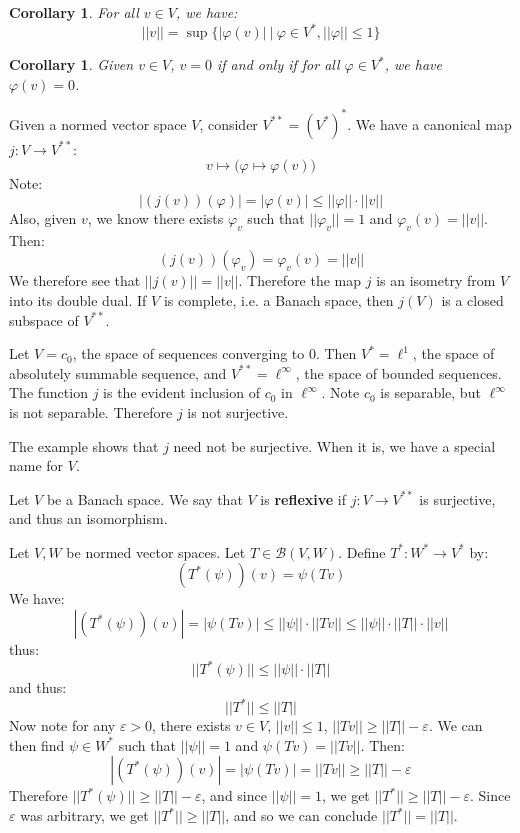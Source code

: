\documentclass[a4paper,12pt]{report}
\newcommand{\ms}[1]{\mathscr{#1}}
\newcommand{\varep}{ \varepsilon }
\newcommand{\vphi} {\varphi}
\newtheorem{corollary}[theorem]{Corollary}
\newenvironment{definition}[1][Definition.]{\begin{trivlist}
\item[\hskip \labelsep {\bfseries #1}]}{\end{trivlist}}
\newenvironment{example}[1][Example.]{\begin{trivlist}
\item[\hskip \labelsep {\bfseries #1}]}{\end{trivlist}}
\begin{document}
	\begin{corollary}
	For all $v \in V$, we have:
	\[ ||v|| = \sup \bigg\{ |\vphi(v)| ~\big|~ \vphi \in V^*, ||\vphi|| \leq 1 \bigg\} \]
	\end{corollary}
	
	\begin{corollary}
	Given $v \in V$, $v = 0$ if and only if for all $\vphi \in V^*$, we have $\vphi(v) = 0$. 
	\end{corollary}
	
	\noindent Given a normed vector space $V$, consider $V^{**} = (V^*)^*$. We have a canonical map $j : V \rightarrow V^{**}$:
	\[ v \mapsto \bigg( \vphi \mapsto \vphi(v) \bigg) \]
	Note:
	\[ |(j(v))(\vphi)| = |\vphi(v)| \leq ||\vphi|| \cdot ||v|| \]
	Also, given $v$, we know there exists $\vphi_v$ such that $||\vphi_v|| = 1$ and $\vphi_v(v) = ||v||$. Then:
	\[ (j(v))(\vphi_v) = \vphi_v(v) = ||v|| \]
	We therefore see that $||j(v)|| = ||v||$. Therefore the map $j$ is an isometry from $V$ into its double dual. If $V$ is complete, i.e. a Banach space, then $j(V)$ is a closed subspace of $V^{**}$. 
	
	\begin{example}
	Let $V = c_0$, the space of sequences converging to 0. Then $V^* = \ell^1$, the space of absolutely summable sequence, and $V^{**} = \ell^\infty$, the space of bounded sequences. The function $j$ is the evident inclusion of $c_0$ in $\ell^\infty$. Note $c_0$ is separable, but $\ell^\infty$ is not separable. Therefore $j$ is not surjective. 
	\end{example}
	
	\noindent The example shows that $j$ need not be surjective. When it is, we have a special name for $V$.
	
	\begin{definition}
	Let $V$ be a Banach space. We say that $V$ is \textbf{reflexive} if $j : V \rightarrow V^{**}$ is surjective, and thus an isomorphism. 
	\end{definition}
	
	\noindent Let $V, W$ be normed vector spaces. Let $T \in \ms{B}(V, W)$. Define $T^* : W^* \rightarrow V^*$ by:
	\[ (T^*(\psi))(v) = \psi(Tv) \]
	We have:
	\[ |(T^*(\psi))(v)| = |\psi(Tv)| \leq ||\psi|| \cdot ||Tv|| \leq ||\psi|| \cdot ||T|| \cdot ||v|| \]
	thus:
	\[ ||T^*(\psi)|| \leq ||\psi|| \cdot ||T|| \]
	and thus:
	\[ ||T^*|| \leq ||T|| \]
	Now note for any $\varep > 0$, there exists $v \in V$, $||v|| \leq 1$, $||Tv|| \geq ||T|| - \varep$. We can then find $\psi \in W^*$ such that $||\psi|| = 1$ and $\psi(Tv) = ||Tv||$. Then:
	\[ |(T^*(\psi))(v)| = |\psi(Tv)| = ||Tv|| \geq ||T|| - \varep \]
	Therefore $||T^*(\psi)|| \geq ||T|| - \varep$, and since $||\psi|| = 1$, we get $||T^*|| \geq ||T|| - \varep$. Since $\varep$ was arbitrary, we get $||T^*|| \geq ||T||$, and so we can conclude $||T^*|| = ||T||$. 
	
\end{document}
